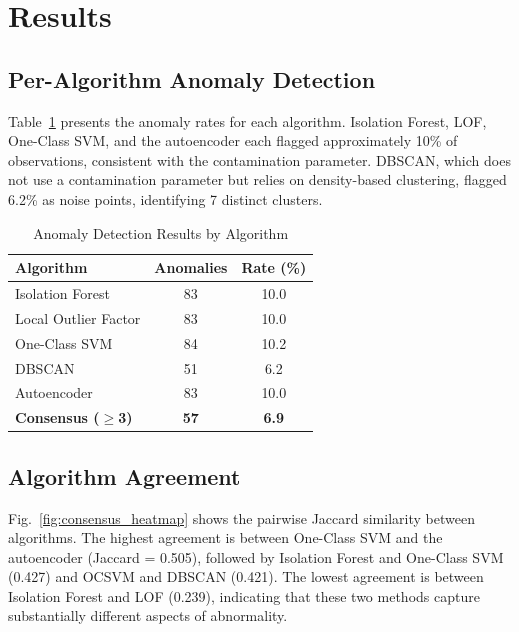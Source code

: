 \documentclass{ieeeaccess}
\begin{document}
\section{Results}
\label{sec:results}

\subsection{Per-Algorithm Anomaly Detection}
\label{subsec:per_algo}

Table~\ref{tab:algo_rates} presents the anomaly rates for each algorithm. Isolation Forest, LOF, One-Class SVM, and the autoencoder each flagged approximately 10\% of observations, consistent with the contamination parameter. DBSCAN, which does not use a contamination parameter but relies on density-based clustering, flagged 6.2\% as noise points, identifying 7 distinct clusters.

\begin{table}[!t]
\centering
\caption{Anomaly Detection Results by Algorithm}
\label{tab:algo_rates}
\begin{tabular}{@{}lcc@{}}
\toprule
\textbf{Algorithm} & \textbf{Anomalies} & \textbf{Rate (\%)} \\
\midrule
Isolation Forest & 83 & 10.0 \\
Local Outlier Factor & 83 & 10.0 \\
One-Class SVM & 84 & 10.2 \\
DBSCAN & 51 & 6.2 \\
Autoencoder & 83 & 10.0 \\
\midrule
\textbf{Consensus ($\geq$3)} & \textbf{57} & \textbf{6.9} \\
\bottomrule
\end{tabular}
\end{table}

\subsection{Algorithm Agreement}
\label{subsec:agreement}

Fig.~\ref{fig:consensus_heatmap} shows the pairwise Jaccard similarity between algorithms. The highest agreement is between One-Class SVM and the autoencoder (Jaccard = 0.505), followed by Isolation Forest and One-Class SVM (0.427) and OCSVM and DBSCAN (0.421). The lowest agreement is between Isolation Forest and LOF (0.239), indicating that these two methods capture substantially different aspects of abnormality.
\end{document}
